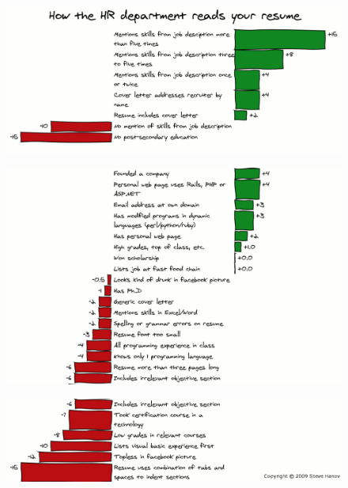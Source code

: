 
\begin{frame}
	\begin{figure}
		\includegraphics[scale=.35]{assets/diff1}
	\end{figure}
\end{frame}

\begin{frame}
	\begin{figure}
		\includegraphics[scale=.35]{assets/diff2}
	\end{figure}
\end{frame}

\begin{frame}
	\begin{figure}
		\includegraphics[scale=.35]{assets/diff3}
	\end{figure}
\end{frame}

